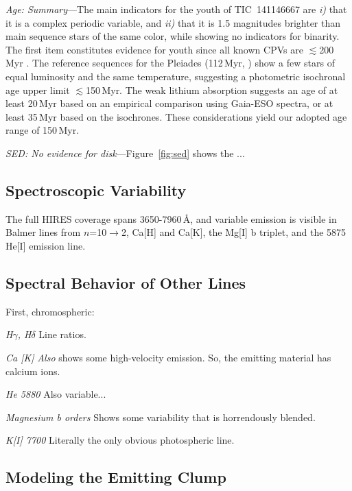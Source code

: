 \documentclass{nature3}
\begin{document}
\begin{methods}
{\it Age: Summary}---The main indicators for the youth of
TIC~141146667 are {\it i)} that it is a complex periodic variable, and
{\it ii)} that it is 1.5 magnitudes brighter than main sequence stars
of the same color, while showing no indicators for binarity.  The
first item constitutes evidence for youth since all known CPVs are
$\lesssim$200\,Myr \cite{Bouma2024}.  The reference sequences for the
Pleiades (112\,Myr, \cite{Dahm2015}) show a few stars of equal
luminosity and the same temperature, suggesting a photometric
isochronal age upper limit $\lesssim$150\,Myr.  The weak lithium
absorption suggests an age of at least 20\,Myr based on an empirical
comparison using Gaia-ESO spectra, or at least 35\,Myr based on the
\cite{Feiden2016} isochrones.  These considerations yield our adopted
age range of 150\,Myr.



{\it SED: No evidence for disk}---Figure~\ref{fig:sed} shows the 
...



\subsection{Spectroscopic Variability}\phantom{+}

The full HIRES coverage spans 3650-7960\,\AA, and variable
  emission is visible in Balmer lines from $n$=10$\rightarrow$2, Ca[H]
  and Ca[K], the Mg[I] b triplet, and the 5875 He[I] emission line.




\subsection{Spectral Behavior of Other Lines}

First, chromospheric:

{\it H$\gamma$, H$\delta$}
Line ratios.

{\it Ca [K]}
{\it Also} shows some high-velocity emission.  So, the emitting material has
calcium ions.

{\it He 5880}
Also variable...

{\it Magnesium b orders}
Shows some variability that is horrendously blended.

{\it K[I] 7700}
Literally the only obvious photospheric line.



\subsection{Modeling the Emitting Clump}
\label{subsec:model}


\end{methods}
\end{document}
